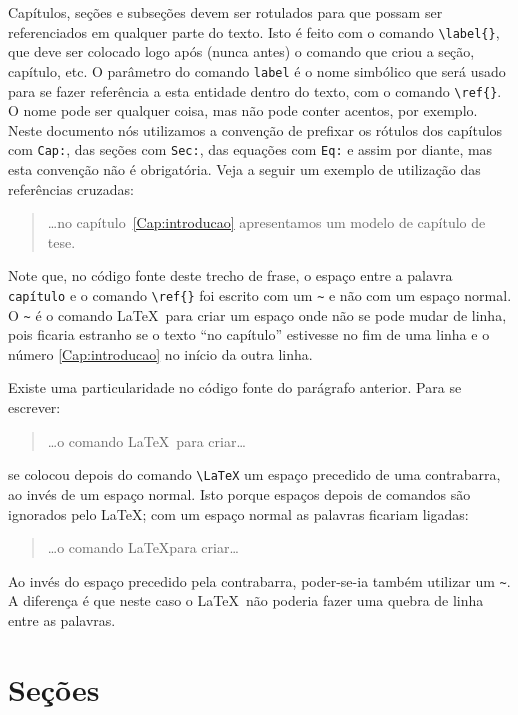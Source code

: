 Capítulos, seções e subseções devem ser rotulados para que possam ser
referenciados em qualquer parte do texto.  Isto é feito com o comando
\verb|\label{}|, que deve ser colocado logo após (nunca antes) o
comando que criou a seção, capítulo, etc. O parâmetro do comando
\texttt{label} é o nome simbólico que será usado para se fazer
referência a esta entidade dentro do texto, com o comando
\verb|\ref{}|. O nome pode ser qualquer coisa, mas não pode conter
acentos, por exemplo. Neste documento nós utilizamos a convenção de
prefixar os rótulos dos capítulos com \texttt{Cap:}, das seções com
\texttt{Sec:}, das equações com \texttt{Eq:} e assim por diante, mas
esta convenção não é obrigatória. Veja a seguir um exemplo de
utilização das referências cruzadas:
\begin{quotation}
\dots no capítulo~\ref{Cap:introducao} apresentamos um modelo de
capítulo de tese.
\end{quotation}
Note que, no código fonte deste trecho de frase, o espaço entre a palavra
\texttt{capítulo} e o comando \verb|\ref{}| foi escrito com
um \texttt{\~{}} e não com um espaço normal. O \texttt{\~{}} é o
comando \LaTeX\ para criar um espaço onde não se pode mudar de linha,
pois ficaria estranho se o texto ``no capítulo'' estivesse no fim de
uma linha e o número \ref{Cap:introducao} no início da outra linha.

Existe uma particularidade no código fonte do parágrafo anterior. Para
se escrever:
\begin{quotation}
\dots o comando \LaTeX\ para criar\dots
\end{quotation}
se colocou depois do comando \verb|\LaTeX| um espaço
precedido de uma contrabarra, ao invés de um espaço normal. Isto porque
espaços depois de comandos são ignorados pelo \LaTeX; com um espaço
normal as palavras ficariam ligadas:
\begin{quotation}
\dots o comando \LaTeX para criar\dots
\end{quotation}
Ao invés do espaço precedido pela contrabarra, poder-se-ia também
utilizar um \texttt{\~{}}. A diferença é que neste caso o \LaTeX\ não
poderia fazer uma quebra de linha entre as palavras.

\section{Seções}
\label{Sec:secoes}  %

